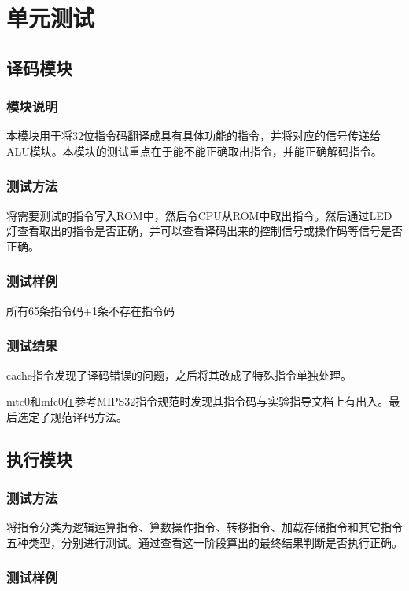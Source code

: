 \section{单元测试}
\subsection{译码模块}
\subsubsection{模块说明}

本模块用于将32位指令码翻译成具有具体功能的指令，并将对应的信号传递给ALU模块。本模块的测试重点在于能不能正确取出指令，并能正确解码指令。

\subsubsection{测试方法}

将需要测试的指令写入ROM中，然后令CPU从ROM中取出指令。然后通过LED灯查看取出的指令是否正确，并可以查看译码出来的控制信号或操作码等信号是否正确。

\subsubsection{测试样例}

所有65条指令码+1条不存在指令码

\subsubsection{测试结果}

cache指令发现了译码错误的问题，之后将其改成了特殊指令单独处理。

mtc0和mfc0在参考MIPS32指令规范时发现其指令码与实验指导文档上有出入。最后选定了规范译码方法。

\subsection{执行模块}
\subsubsection{测试方法}

将指令分类为逻辑运算指令、算数操作指令、转移指令、加载存储指令和其它指令五种类型，分别进行测试。通过查看这一阶段算出的最终结果判断是否执行正确。

\subsubsection{测试样例}

